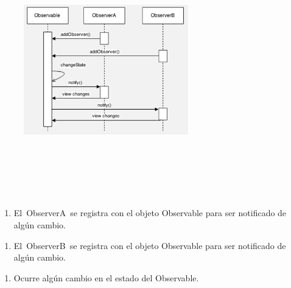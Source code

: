\documentclass[12pt]{article}
\begin{document}
\begin{multicols}{2}

\begin{figure}[H]		\includegraphics[width=2.81in,height=2.22in]{./media/image12.png}
\end{figure}



{\fontsize{10pt}{12.0pt}\selectfont \textbf{ }\par}\par

{\fontsize{10pt}{12.0pt}\selectfont \textbf{ }\par}\par

{\fontsize{10pt}{12.0pt}\selectfont \textbf{ }\par}\par

\begin{enumerate}[label*={\fontsize{9pt}{9pt}\selectfont \arabic*.}]
	\item {\fontsize{9pt}{10.8pt}\selectfont El ObserverA se registra con el objeto Observable para ser notificado de algún cambio. \par}
\end{enumerate}\par

\begin{enumerate}[label*={\fontsize{9pt}{9pt}\selectfont \arabic*.}]
	\item {\fontsize{9pt}{10.8pt}\selectfont El ObserverB se registra con el objeto Observable para ser notificado de algún cambio. \par}
\end{enumerate}\par

\begin{enumerate}[label*={\fontsize{9pt}{9pt}\selectfont \arabic*.}]
	\item {\fontsize{9pt}{10.8pt}\selectfont Ocurre algún cambio en el estado del Observable. \par}
\end{enumerate}\par


\end{multicols}
\end{document}
